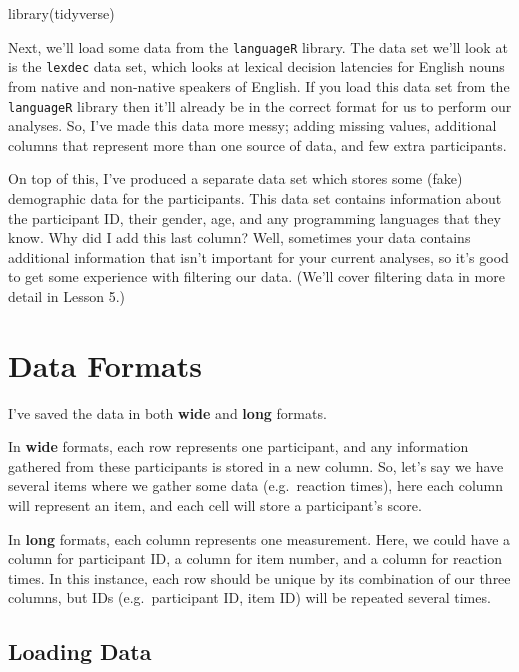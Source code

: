 \documentclass[
]{book}
\newenvironment{Shaded}{\begin{snugshade}}{\end{snugshade}}
\newcommand{\FunctionTok}[1]{\textcolor[rgb]{0.00,0.00,0.00}{#1}}
\newcommand{\NormalTok}[1]{#1}
\begin{document}
\begin{Shaded}
\begin{Highlighting}[]
\FunctionTok{library}\NormalTok{(tidyverse)}
\end{Highlighting}
\end{Shaded}

Next, we'll load some data from the \texttt{languageR} library. The data set we'll look at is the \texttt{lexdec} data set, which looks at lexical decision latencies for English nouns from native and non-native speakers of English. If you load this data set from the \texttt{languageR} library then it'll already be in the correct format for us to perform our analyses. So, I've made this data more messy; adding missing values, additional columns that represent more than one source of data, and few extra participants.

On top of this, I've produced a separate data set which stores some (fake) demographic data for the participants. This data set contains information about the participant ID, their gender, age, and any programming languages that they know. Why did I add this last column? Well, sometimes your data contains additional information that isn't important for your current analyses, so it's good to get some experience with filtering our data. (We'll cover filtering data in more detail in Lesson 5.)

\hypertarget{data-formats}{%
\section{Data Formats}\label{data-formats}}

I've saved the data in both \textbf{wide} and \textbf{long} formats.

In \textbf{wide} formats, each row represents one participant, and any information gathered from these participants is stored in a new column. So, let's say we have several items where we gather some data (e.g.~reaction times), here each column will represent an item, and each cell will store a participant's score.

In \textbf{long} formats, each column represents one measurement. Here, we could have a column for participant ID, a column for item number, and a column for reaction times. In this instance, each row should be unique by its combination of our three columns, but IDs (e.g.~participant ID, item ID) will be repeated several times.

\hypertarget{loading-data}{%
\subsection{Loading Data}\label{loading-data}}
\end{document}
